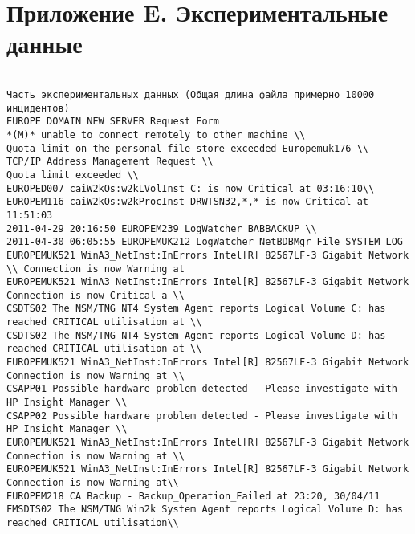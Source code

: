 \clearpage
\chapter{Приложение E. Экспериментальные данные}\label{AppendixE}
\begin{lstlisting}
	
Часть экспериментальных данных (Общая длина файла примерно 10000 инцидентов)
EUROPE DOMAIN NEW SERVER Request Form
*(M)* unable to connect remotely to other machine \\
Quota limit on the personal file store exceeded Europemuk176 \\
TCP/IP Address Management Request \\
Quota limit exceeded \\
EUROPED007 caiW2kOs:w2kLVolInst C: is now Critical at 03:16:10\\
EUROPEM116 caiW2kOs:w2kProcInst DRWTSN32,*,* is now Critical at 11:51:03
2011-04-29 20:16:50 EUROPEM239 LogWatcher BABBACKUP \\
2011-04-30 06:05:55 EUROPEMUK212 LogWatcher NetBDBMgr File SYSTEM_LOG 
EUROPEMUK521 WinA3_NetInst:InErrors Intel[R] 82567LF-3 Gigabit Network \\ Connection is now Warning at 
EUROPEMUK521 WinA3_NetInst:InErrors Intel[R] 82567LF-3 Gigabit Network Connection is now Critical a \\
CSDTS02 The NSM/TNG NT4 System Agent reports Logical Volume C: has reached CRITICAL utilisation at \\
CSDTS02 The NSM/TNG NT4 System Agent reports Logical Volume D: has reached CRITICAL utilisation at \\
EUROPEMUK521 WinA3_NetInst:InErrors Intel[R] 82567LF-3 Gigabit Network Connection is now Warning at \\
CSAPP01 Possible hardware problem detected - Please investigate with HP Insight Manager \\
CSAPP02 Possible hardware problem detected - Please investigate with HP Insight Manager \\
EUROPEMUK521 WinA3_NetInst:InErrors Intel[R] 82567LF-3 Gigabit Network Connection is now Warning at \\
EUROPEMUK521 WinA3_NetInst:InErrors Intel[R] 82567LF-3 Gigabit Network Connection is now Warning at\\
EUROPEM218 CA Backup - Backup_Operation_Failed at 23:20, 30/04/11
FMSDTS02 The NSM/TNG Win2k System Agent reports Logical Volume D: has reached CRITICAL utilisation\\

\end{lstlisting}
